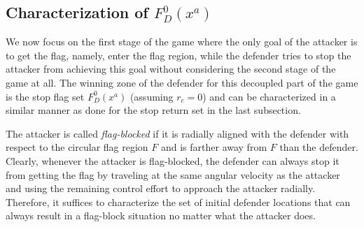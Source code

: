 \subsection{Characterization of $F_D^0(x^a)$}
\label{sec:FD0}
We now focus on the first stage of the game where the only goal of the attacker is to get the flag, namely, enter the flag region, while the defender tries to stop the attacker from achieving this goal without considering the second stage of the game at all. The winning zone of the defender for this decoupled part of the game is the stop flag set $F_D^0(x^a)$ (assuming $r_c=0$) and can be characterized in a similar manner as done for the stop return set in the last subsection. 

The attacker is called {\em flag-blocked} if it is radially aligned with the defender with respect to the circular flag region $F$ and is farther away from $F$ than the defender. Clearly, whenever the attacker is flag-blocked, the defender can always stop it from getting the flag by traveling at the same angular velocity as the attacker and using the remaining control effort to approach the attacker radially. Therefore, it suffices to characterize the set of initial defender locations that can always result in a flag-block situation no matter what the attacker does. 


